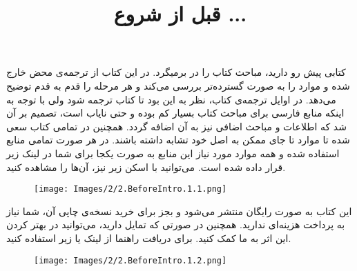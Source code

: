 \newpage

\textbf{\vspace{80pt}}
\title{
    \BTitr
    \center \Huge
    \begin{flushright}
        \textbf{قبل از شروع ...}
    \end{flushright}
}
\textbf{\vspace{80pt}}

{
    \Large
    کتابی پیش رو دارید، مباحث کتاب  را در برمیگرد.
    در این کتاب از ترجمه‌ی محض خارج شده و موارد را به صورت گسترده‌تر بررسی می‌کند و هر مرحله را قدم به قدم توضیح می‌دهد.
    در اوایل ترجمه‌ی کتاب، نظر به این بود تا کتاب ترجمه شود ولی با توجه به اینکه منابع فارسی برای مباحث کتاب بسیار کم بوده و حتی نایاب است، تصمیم بر آن شد که اطلاعات و مباحث اضافی نیز به آن اضافه گردد.
    همچنین در تمامی کتاب سعی شده تا موارد تا جای ممکن به اصل خود تشابه داشته باشند.
    در هر صورت تمامی منابع استفاده شده و همه موارد مورد نیاز این منابع به صورت یکجا برای شما در لینک زیر قرار داده شده است.
    می‌توانید با اسکن  زیر نیز، آن‌ها را مشاهده کنید.

    \begin{figure}[H]
        \centering
        \setlength{\belowcaptionskip}{-10pt}
        \texttt{[image: Images/2/2.BeforeIntro.1.1.png]}
        \caption*{\Large {}}
    \end{figure}

    این کتاب به صورت رایگان منتشر می‌شود و بجز برای خرید نسخه‌ی چاپی آن، شما نیاز به پرداخت هزینه‌ای ندارید.
    همچنین در صورتی که تمایل دارید، می‌توانید در بهتر کردن این اثر به ما کمک کنید. برای دریافت راهنما از لینک یا  زیر استفاده کنید.

    \begin{figure}[H]
        \centering
        \Large
        \setlength{\belowcaptionskip}{-10pt}
        \texttt{[image: Images/2/2.BeforeIntro.1.2.png]}
        \caption*{\Large {}}
    \end{figure}
}

